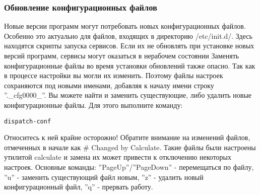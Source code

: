 \subsubsection{Обновление конфигурационных файлов}
Новые версии программ могут потребовать новых конфигурационных файлов. Особенно это актуально для файлов, входящих в директорию /etc/init.d/. Здесь находятся скрипты запуска сервисов. Если их не обновлять при установке новых версий программ, сервисы могут оказаться в нерабочем состоянии
Заменять конфигурационные файлы во время установки обновлений также опасно. Так как в процессе настройки вы могли их изменить. 
Поэтому файлы настроек сохраняются под новыми именами, добавляя к началу имени строку ''.\_cfg0000\_''.
Вы можете найти и заменить существующие, либо удалить новые конфигурационные файлы. Для этого выполните команду:
\begin{verbatim}
dispatch-conf
\end{verbatim}
Относитесь к ней крайне осторожно! Обратите внимание на изменений файлов, отмеченных в начале как \# Changed by Calculate. Такие файлы были настроены утилитой calculate и замена их может привести к отключению некоторых настроек.
Основные команды: ''PageUp''/''PageDown'' - перемещаться по файлу, ''u'' - заменить существующий файл новым, ''z'' - удалить новый конфигурационный файл, ''q'' - прервать работу.